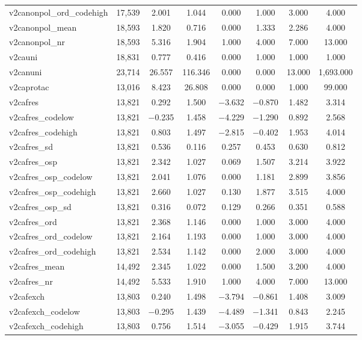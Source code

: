\begin{table}[!htbp]
\begin{tabular}{@{\extracolsep{5pt}}lccccccc}
v2canonpol\_ord\_codehigh & 17,539 & 2.001 & 1.044 & 0.000 & 1.000 & 3.000 & 4.000 \\ 
v2canonpol\_mean & 18,593 & 1.820 & 0.716 & 0.000 & 1.333 & 2.286 & 4.000 \\ 
v2canonpol\_nr & 18,593 & 5.316 & 1.904 & 1.000 & 4.000 & 7.000 & 13.000 \\ 
v2cauni & 18,831 & 0.777 & 0.416 & 0.000 & 1.000 & 1.000 & 1.000 \\ 
v2canuni & 23,714 & 26.557 & 116.346 & 0.000 & 0.000 & 13.000 & 1,693.000 \\ 
v2caprotac & 13,016 & 8.423 & 26.808 & 0.000 & 0.000 & 1.000 & 99.000 \\ 
v2cafres & 13,821 & 0.292 & 1.500 & $-$3.632 & $-$0.870 & 1.482 & 3.314 \\ 
v2cafres\_codelow & 13,821 & $-$0.235 & 1.458 & $-$4.229 & $-$1.290 & 0.892 & 2.568 \\ 
v2cafres\_codehigh & 13,821 & 0.803 & 1.497 & $-$2.815 & $-$0.402 & 1.953 & 4.014 \\ 
v2cafres\_sd & 13,821 & 0.536 & 0.116 & 0.257 & 0.453 & 0.630 & 0.812 \\ 
v2cafres\_osp & 13,821 & 2.342 & 1.027 & 0.069 & 1.507 & 3.214 & 3.922 \\ 
v2cafres\_osp\_codelow & 13,821 & 2.041 & 1.076 & 0.000 & 1.181 & 2.899 & 3.856 \\ 
v2cafres\_osp\_codehigh & 13,821 & 2.660 & 1.027 & 0.130 & 1.877 & 3.515 & 4.000 \\ 
v2cafres\_osp\_sd & 13,821 & 0.316 & 0.072 & 0.129 & 0.266 & 0.351 & 0.588 \\ 
v2cafres\_ord & 13,821 & 2.368 & 1.146 & 0.000 & 1.000 & 3.000 & 4.000 \\ 
v2cafres\_ord\_codelow & 13,821 & 2.164 & 1.193 & 0.000 & 1.000 & 3.000 & 4.000 \\ 
v2cafres\_ord\_codehigh & 13,821 & 2.534 & 1.142 & 0.000 & 2.000 & 3.000 & 4.000 \\ 
v2cafres\_mean & 14,492 & 2.345 & 1.022 & 0.000 & 1.500 & 3.200 & 4.000 \\ 
v2cafres\_nr & 14,492 & 5.533 & 1.910 & 1.000 & 4.000 & 7.000 & 13.000 \\ 
v2cafexch & 13,803 & 0.240 & 1.498 & $-$3.794 & $-$0.861 & 1.408 & 3.009 \\ 
v2cafexch\_codelow & 13,803 & $-$0.295 & 1.439 & $-$4.489 & $-$1.341 & 0.843 & 2.245 \\ 
v2cafexch\_codehigh & 13,803 & 0.756 & 1.514 & $-$3.055 & $-$0.429 & 1.915 & 3.744 \\ 

\end{tabular}
\end{table}
